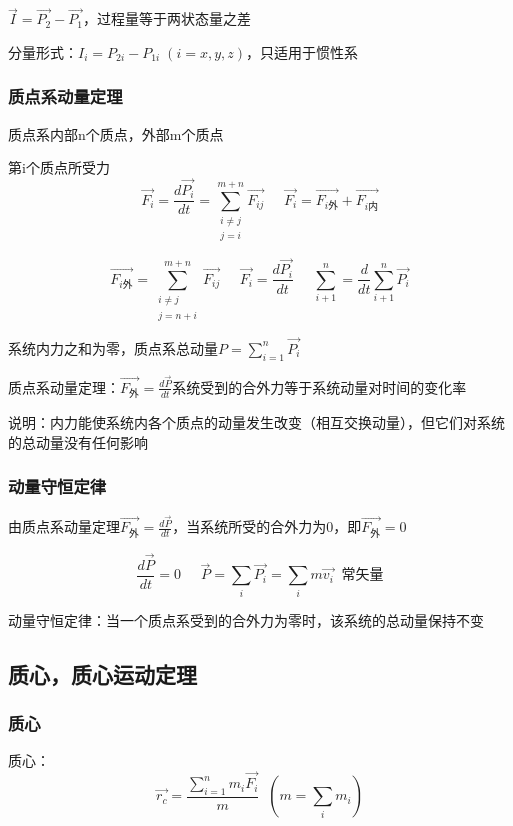 \documentclass[UTF8]{article}
\begin{document}
    $\vec{I} = \vec{P_2} - \vec{P_1}$，过程量等于两状态量之差

    分量形式：$I_i = P_{2i} - P_{1i}\;(i = x, y, z)$，只适用于惯性系

\subsubsection{质点系动量定理}

    质点系内部n个质点，外部m个质点

    第i个质点所受力
    \[\vec{F_i} = \frac{d\vec{P_i}}{dt} = \sum_{\substack{i\neq j\\j=i}}^{m+n}\vec{F_{ij}}\;\;\;\;\;\vec{F_i} = \vec{F_{i\mbox{外}}}+\vec{F_{i\mbox{内}}}\]

    \[\vec{F_{i\mbox{外}}} = \sum_{\substack{i\neq j\\j=n+i}}^{m+n}\vec{F_{ij}}\;\;\;\;\;\vec{F_i} = \frac{d\vec{P_i}}{dt}\;\;\;\;\;\sum_{i+1}^n = \frac{d}{dt}\sum_{i+1}^n\vec{P_i}\]
    
    系统内力之和为零，质点系总动量\;\;$P = \sum_{i=1}^n\vec{P_i}$

    质点系动量定理：$\vec{F_{\mbox{外}}} = \frac{d\vec{P}}{dt}$\;\;\;系统受到的合外力等于系统动量对时间的变化率

    说明：内力能使系统内各个质点的动量发生改变（相互交换动量），但它们对系统的总动量没有任何影响

\subsubsection{动量守恒定律}

    由质点系动量定理\;\;\;$\vec{F_{\mbox{外}}} = \frac{d\vec{P}}{dt}$，当系统所受的合外力为0，即$\vec{F_{\mbox{外}}} = 0$

    \[\frac{d\vec{P}}{dt} = 0\;\;\;\;\;\vec{P} = \sum_i\vec{P_i} = \sum_im\vec{v_i}\;\;\mbox{常矢量}\]

    动量守恒定律：当一个质点系受到的合外力为零时，该系统的总动量保持不变

\subsection{质心，质心运动定理}

\subsubsection{质心}

    质心：\[\vec{r_c} = \frac{\sum_{i=1}^n m_i\vec{F_i}}{m}\;\;(m = \sum_i m_i)\]
\end{document}
